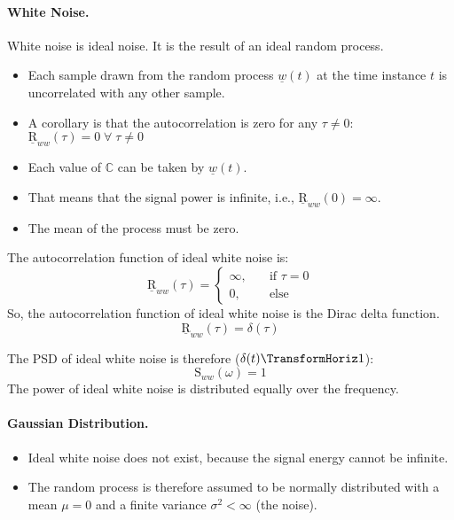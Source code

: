 \begin{refsection}
\paragraph{White Noise.}

 White noise is ideal noise. It is the result of an ideal random process.
\begin{itemize}
	\item Each sample drawn from the random process $\underline{w}(t)$ at the time instance $t$ is uncorrelated with any other sample.
	\item A corollary is that the autocorrelation is zero for any $\tau \neq 0$: $\underline{\mathrm{R}}_{ww}(\tau) = 0 \; \forall\; \tau \neq 0$
	\item Each value of $\mathbb{C}$ can be taken by $\underline{w}(t)$.
	\item That means that the signal power is infinite, i.e., $\underline{\mathrm{R}}_{ww}(0) = \infty$.
	\item The mean of the process must be zero.
\end{itemize}

The autocorrelation function of ideal white noise is:
\begin{equation}
	\underline{\mathrm{R}}_{ww}(\tau) = \begin{cases}
		\infty, & \quad \text{if } \tau = 0 \\
		0, & \quad \text{else}
	\end{cases}
\end{equation}
So, the autocorrelation function of ideal white noise is the Dirac delta function.
\begin{equation}
	\underline{\mathrm{R}}_{ww}(\tau) = \delta(\tau)
\end{equation}

The \ac{PSD} of ideal white noise is therefore ($\delta(t) \TransformHoriz 1$):
\begin{equation}
	\mathrm{S}_{ww}(\omega) = 1
\end{equation}
The power of ideal white noise is distributed equally over the frequency.

\paragraph{Gaussian Distribution.}

\begin{itemize}
	\item Ideal white noise does not exist, because the signal energy cannot be infinite.
	\item The random process is therefore assumed to be normally distributed with a mean $\mu = 0$ and a finite variance $\sigma^2 < \infty$ (the noise).
\end{itemize}


\end{refsection}
